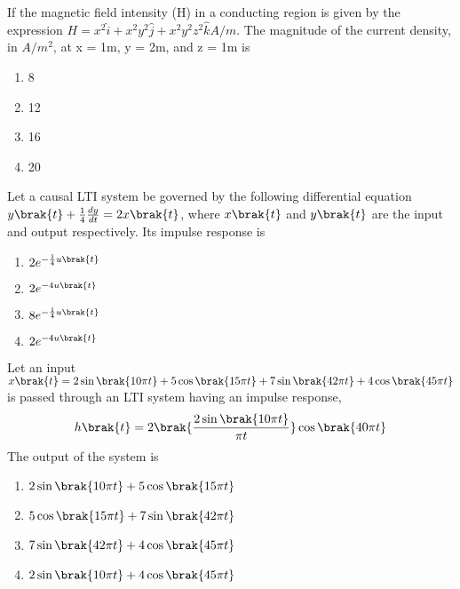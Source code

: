 \item If the magnetic field intensity (H) in a conducting region is given by the expression $H = x^2 \hat{i}+ x^2y^2\hat{j}+ x^2y^2z^2\hat{k} A/m$. The magnitude of the current density, in $A/m^2$, at x = 1m, y = 2m, and z = 1m is
\begin{enumerate}
    \item 8
    \item 12
    \item 16
    \item 20
\end{enumerate}

\item Let a causal LTI system be governed by the following differential equation $y\brak{t} + \frac{1}{4}\frac{dy}{dt} = 2x\brak{t}$, where $x\brak{t}$ and $y\brak{t}$ are the input and output respectively. Its impulse response is 
\begin{enumerate}
    \item $2e^{-\frac{1}{4}u\brak{t}}$
    \item $2e^{-4u\brak{t}}$
    \item $8e^{-\frac{1}{4}u\brak{t}}$
    \item $2e^{-4u\brak{t}}$
\end{enumerate}

\item Let an input $x\brak{t} = 2\sin\brak{10\pi t} + 5\cos\brak{15\pi t} + 7\sin\brak{42\pi t} + 4\cos\brak{45\pi t}$ is passed through an LTI system having an impulse response,
\begin{align*}
    h\brak{t} = 2\brak{\frac{2\sin\brak{10\pi t}}{\pi t}}\cos\brak{40\pi t}
\end{align*}
The output of the system is
\begin{enumerate}
    \item $2\sin\brak{10\pi t} + 5\cos\brak{15\pi t}$
    \item $5\cos\brak{15\pi t} + 7\sin\brak{42\pi t}$
    \item $7\sin\brak{42\pi t} + 4\cos\brak{45\pi t}$
    \item $2\sin\brak{10\pi t} + 4\cos\brak{45\pi t}$
\end{enumerate}

